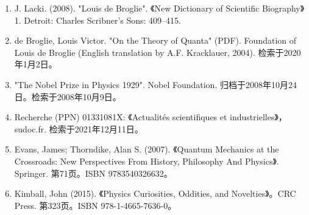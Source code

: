 \begin{enumerate}
\item J. Lacki. (2008). "Louis de Broglie". 《New Dictionary of Scientific Biography》 1. Detroit: Charles Scribner's Sons: 409–415.
\item de Broglie, Louis Victor. "On the Theory of Quanta" (PDF). Foundation of Louis de Broglie (English translation by A.F. Kracklauer, 2004). 检索于2020年1月2日。
\item "The Nobel Prize in Physics 1929". Nobel Foundation. 归档于2008年10月24日。检索于2008年10月9日。
\item Recherche (PPN) 01331081X: 《Actualités scientifiques et industrielles》，sudoc.fr. 检索于2021年12月11日。
\item Evans, James; Thorndike, Alan S. (2007). 《Quantum Mechanics at the Crossroads: New Perspectives From History, Philosophy And Physics》. Springer. 第71页。ISBN 9783540326632。
\item Kimball, John (2015). 《Physics Curiosities, Oddities, and Novelties》。CRC Press. 第323页。ISBN 978-1-4665-7636-0。
\end{enumerate}
